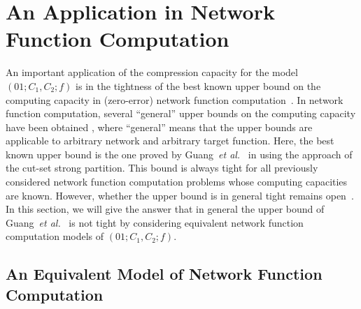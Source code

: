 \documentclass[11pt,draftclsnofoot,onecolumn]{IEEEtran}
\begin{document}
{\section{An Application in Network Function Computation}\label{sec:equ-model}

An important application of the compression capacity for the model $(01;C_1,C_2;f)$ is in the tightness of the best known upper bound on the computing capacity in (zero-error) network function computation~\cite{Guang_Improved_upper_bound}. In network function computation, several ``general'' upper bounds on the computing capacity have been obtained \cite{Appuswamy11,Huang_Comment_cut_set_bound,Guang_Improved_upper_bound}, where ``general'' means that the upper bounds are applicable to arbitrary network and arbitrary target function. Here, the best known upper bound is the one proved by Guang~\emph{et al.}~\cite{Guang_Improved_upper_bound} in using the approach of the cut-set strong partition. This bound is always tight for all previously considered network function computation problems whose computing capacities are known. However, whether the upper bound is in general tight remains open~\cite{Guang_Improved_upper_bound}. In this section, we will give the answer that in general the upper bound of Guang~\emph{et al.}~\cite{Guang_Improved_upper_bound} is not tight by considering equivalent network function computation models of $(01;C_1,C_2;f)$.

\subsection{An Equivalent Model of Network Function Computation}\label{subsec:equ-model}

}
\end{document}
